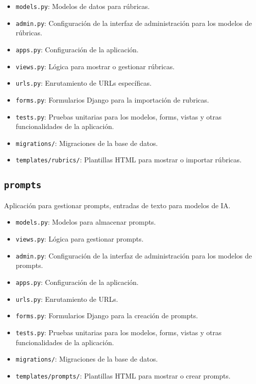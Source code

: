 \begin{itemize}
    \item \texttt{models.py}: Modelos de datos para rúbricas.
    \item \texttt{admin.py}: Configuración de la interfaz de administración para los modelos de rúbricas.
    \item \texttt{apps.py}: Configuración de la aplicación.
    \item \texttt{views.py}: Lógica para mostrar o gestionar rúbricas.
    \item \texttt{urls.py}: Enrutamiento de URLs específicas.
    \item \texttt{forms.py}: Formularios Django para la importación de rubricas.
    \item \texttt{tests.py}: Pruebas unitarias para los modelos, forms, vistas y otras funcionalidades de la aplicación.
    \item \texttt{migrations/}: Migraciones de la base de datos.
    \item \texttt{templates/rubrics/}: Plantillas HTML para mostrar o importar rúbricas.
\end{itemize}

\subsection{\texttt{prompts}}
Aplicación para gestionar prompts, entradas de texto para modelos de IA.

\begin{itemize}
    \item \texttt{models.py}: Modelos para almacenar prompts.
    \item \texttt{views.py}: Lógica para gestionar prompts.
    \item \texttt{admin.py}: Configuración de la interfaz de administración para los modelos de prompts.
    \item \texttt{apps.py}: Configuración de la aplicación.
    \item \texttt{urls.py}: Enrutamiento de URLs.
    \item \texttt{forms.py}: Formularios Django para la creación de prompts.
    \item \texttt{tests.py}: Pruebas unitarias para los modelos, forms, vistas y otras funcionalidades de la aplicación.
    \item \texttt{migrations/}: Migraciones de la base de datos.
    \item \texttt{templates/prompts/}: Plantillas HTML para mostrar o crear prompts.
\end{itemize}


